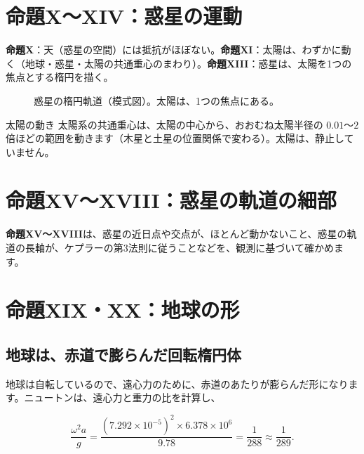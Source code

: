 \documentclass[a4paper,11pt,openany]{ltjsbook}
\begin{document}
\section{命題X〜XIV：惑星の運動}

\textbf{命題X}：天（惑星の空間）には抵抗がほぼない。\textbf{命題XI}：太陽は、わずかに動く（地球・惑星・太陽の共通重心のまわり）。\textbf{命題XIII}：惑星は、太陽を1つの焦点とする楕円を描く。

\begin{figure}[htbp]
\centering
{}
\caption{惑星の楕円軌道（模式図）。太陽は、1つの焦点にある。}
\end{figure}

\begin{examplebox}{太陽の動き}
太陽系の共通重心は、太陽の中心から、おおむね太陽半径の $0.01$〜$2$ 倍ほどの範囲を動きます（木星と土星の位置関係で変わる）。太陽は、静止していません。
\end{examplebox}

\section{命題XV〜XVIII：惑星の軌道の細部}

\textbf{命題XV〜XVIII}は、惑星の近日点や交点が、ほとんど動かないこと、惑星の軌道の長軸が、ケプラーの第3法則に従うことなどを、観測に基づいて確かめます。

\section{命題XIX・XX：地球の形}

\subsection{地球は、赤道で膨らんだ回転楕円体}

地球は自転しているので、遠心力のために、赤道のあたりが膨らんだ形になります。ニュートンは、遠心力と重力の比を計算し、

\[
\frac{\omega^2a}{g}=\frac{(7.292\times10^{-5})^2\times6.378\times10^6}{9.78}=\frac1{288}\approx\frac1{289}.
\]
\end{document}
